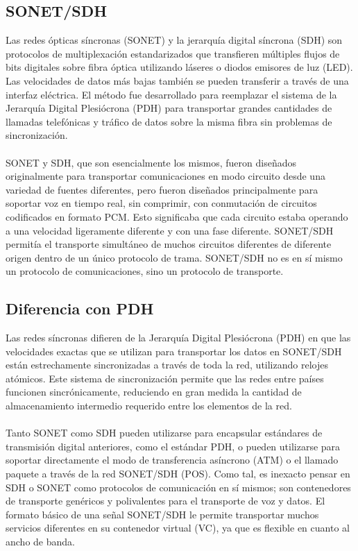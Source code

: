 \documentclass[12pt,letterpaper]{article}
\begin{document}
\subsection{SONET/SDH}
Las redes ópticas síncronas (SONET) y la jerarquía digital síncrona (SDH) son protocolos 
de multiplexación estandarizados que transfieren múltiples flujos de bits digitales sobre 
fibra óptica utilizando láseres o diodos emisores de luz (LED). Las velocidades de datos 
más bajas también se pueden transferir a través de una interfaz eléctrica. El método fue 
desarrollado para reemplazar el sistema de la Jerarquía Digital Plesiócrona (PDH) para 
transportar grandes cantidades de llamadas telefónicas y tráfico de datos sobre la misma 
fibra sin problemas de sincronización.
\\ \\
SONET y SDH, que son esencialmente los mismos, fueron diseñados originalmente para transportar 
comunicaciones en modo circuito desde una variedad de fuentes diferentes, pero fueron diseñados
principalmente para soportar voz en tiempo real, sin comprimir, con conmutación de circuitos 
codificados en formato PCM. Esto significaba que cada circuito estaba operando a una velocidad 
ligeramente diferente y con una fase diferente. SONET/SDH permitía el transporte simultáneo 
de muchos circuitos diferentes de diferente origen dentro de un único protocolo de trama. 
SONET/SDH no es en sí mismo un protocolo de comunicaciones, sino un protocolo de transporte.

\subsection{Diferencia con PDH}
Las redes síncronas difieren de la Jerarquía Digital Plesiócrona (PDH) en que las velocidades 
exactas que se utilizan para transportar los datos en SONET/SDH están estrechamente sincronizadas 
a través de toda la red, utilizando relojes atómicos. Este sistema de sincronización permite que 
las redes entre países funcionen sincrónicamente, reduciendo en gran medida la cantidad de 
almacenamiento intermedio requerido entre los elementos de la red.
\\ \\
Tanto SONET como SDH pueden utilizarse para encapsular estándares de transmisión digital 
anteriores, como el estándar PDH, o pueden utilizarse para soportar directamente el modo de 
transferencia asíncrono (ATM) o el llamado paquete a través de la red SONET/SDH (POS). Como tal, 
es inexacto pensar en SDH o SONET como protocolos de comunicación en sí mismos; son contenedores 
de transporte genéricos y polivalentes para el transporte de voz y datos. El formato básico de una 
señal SONET/SDH le permite transportar muchos servicios diferentes en su contenedor virtual (VC), 
ya que es flexible en cuanto al ancho de banda.
\end{document}
